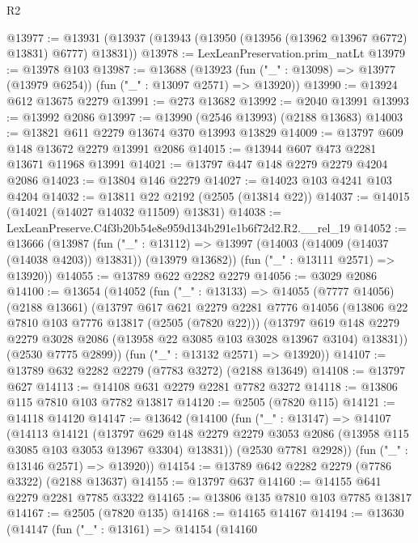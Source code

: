 \begin{lexlean}{R2}
\begin{coremodule}
@13977 := @13931 (@13937 (@13943 (@13950 (@13956 (@13962 @13967 @6772) @13831) @6777) @13831))
@13978 := LexLeanPreservation.prim_natLt
@13979 := @13978 @103
@13987 := @13688
    (@13923 (fun ("_" : @13098) => @13977 (@13979 @6254)) (fun ("_" : @13097 @2571) => @13920))
@13990 := @13924 @612 @13675 @2279
@13991 := @273 @13682
@13992 := @2040 @13991
@13993 := @13992 @2086
@13997 := @13990 (@2546 @13993) (@2188 @13683)
@14003 := @13821 @611 @2279 @13674 @370 @13993 @13829
@14009 := @13797 @609 @148 @13672 @2279 @13991 @2086
@14015 := @13944 @607 @473 @2281 @13671 @11968 @13991
@14021 := @13797 @447 @148 @2279 @2279 @4204 @2086
@14023 := @13804 @146 @2279
@14027 := @14023 @103 @4241 @103 @4204
@14032 := @13811 @22 @2192 (@2505 (@13814 @22))
@14037 := @14015 (@14021 (@14027 @14032 @11509) @13831)
@14038 := LexLeanPreserve.C4f3b20b54e8e959d134b291e1b6f72d2.R2.__rel_19
@14052 := @13666
    (@13987
      (fun ("_" : @13112) =>
      @13997 (@14003 (@14009 (@14037 (@14038 @4203)) @13831)) (@13979 @13682))
      (fun ("_" : @13111 @2571) => @13920))
@14055 := @13789 @622 @2282 @2279
@14056 := @3029 @2086
@14100 := @13654
    (@14052
      (fun ("_" : @13133) =>
      @14055
        (@7777 @14056)
        (@2188 @13661)
        (@13797
          @617
          @621
          @2279
          @2281
          @7776
          @14056
          (@13806 @22 @7810 @103 @7776 @13817 (@2505 (@7820 @22)))
          (@13797
            @619
            @148
            @2279
            @2279
            @3028
            @2086
            (@13958 @22 @3085 @103 @3028 @13967 @3104)
            @13831))
        (@2530 @7775 @2899))
      (fun ("_" : @13132 @2571) => @13920))
@14107 := @13789 @632 @2282 @2279 (@7783 @3272) (@2188 @13649)
@14108 := @13797 @627
@14113 := @14108 @631 @2279 @2281 @7782 @3272
@14118 := @13806 @115 @7810 @103 @7782 @13817
@14120 := @2505 (@7820 @115)
@14121 := @14118 @14120
@14147 := @13642
    (@14100
      (fun ("_" : @13147) =>
      @14107
        (@14113
          @14121
          (@13797
            @629
            @148
            @2279
            @2279
            @3053
            @2086
            (@13958 @115 @3085 @103 @3053 @13967 @3304)
            @13831))
        (@2530 @7781 @2928))
      (fun ("_" : @13146 @2571) => @13920))
@14154 := @13789 @642 @2282 @2279 (@7786 @3322) (@2188 @13637)
@14155 := @13797 @637
@14160 := @14155 @641 @2279 @2281 @7785 @3322
@14165 := @13806 @135 @7810 @103 @7785 @13817
@14167 := @2505 (@7820 @135)
@14168 := @14165 @14167
@14194 := @13630
    (@14147
      (fun ("_" : @13161) =>
      @14154
        (@14160

\end{coremodule}
\end{lexlean}
